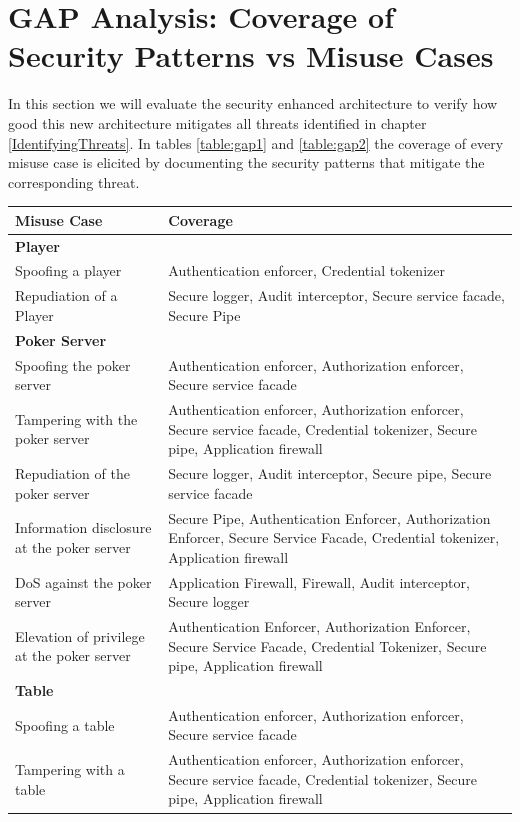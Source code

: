 \documentclass[a4paper,11pt]{report}
\begin{document}
\section{GAP Analysis: Coverage of Security Patterns vs Misuse Cases}
In this section we will evaluate the security enhanced architecture to verify how good this new architecture mitigates all threats identified in chapter \ref{IdentifyingThreats}. In tables \ref{table:gap1} and \ref{table:gap2} the coverage of every misuse case is elicited by documenting the security patterns that mitigate the corresponding threat.
\begin{table}[htpb]
\begin{center}
\begin{tabular}{| p{5cm} | p{} |}
\hline
\textbf{Misuse Case} 	& \textbf{Coverage} \\
\hline
\hline
\textbf{Player} & \\\hline
Spoofing a player & Authentication enforcer, Credential tokenizer \\\hline
Repudiation of a Player & Secure logger, Audit interceptor, Secure service facade, Secure Pipe \\\hline
\textbf{Poker Server} & \\\hline
Spoofing the poker server & Authentication enforcer, Authorization enforcer, Secure service facade \\\hline
Tampering with the poker server & Authentication enforcer, Authorization enforcer, Secure service facade, Credential tokenizer, Secure pipe, Application firewall \\\hline
Repudiation of the poker server & Secure logger, Audit interceptor, Secure pipe, Secure service facade\\\hline
Information disclosure at the poker server & Secure Pipe, Authentication Enforcer, Authorization Enforcer, Secure Service Facade, Credential tokenizer, Application firewall \\\hline
DoS against the poker server & Application Firewall, Firewall, Audit interceptor, Secure logger\\\hline
Elevation of privilege at the poker server & Authentication Enforcer, Authorization Enforcer, Secure Service Facade, Credential Tokenizer, Secure pipe, Application firewall \\\hline
\textbf{Table} & \\\hline
Spoofing a table & Authentication enforcer, Authorization enforcer, Secure service facade \\\hline
Tampering with a table & Authentication enforcer, Authorization enforcer, Secure service facade, Credential tokenizer, Secure pipe, Application firewall \\\hline

\end{tabular}
\end{center}
\end{table}
\end{document}
